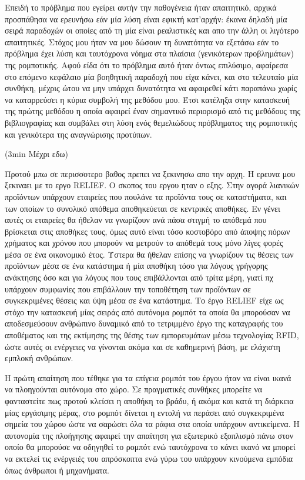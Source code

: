 \documentclass[a4paper,10pt]{article}
\begin{document}
Επειδή το πρόβλημα που εγείρει αυτήν την παθογένεια ήταν απαιτητικό, αρχικά
προσπάθησα να ερευνήσω εάν μία λύση είναι εφικτή κατ'αρχήν: έκανα δηλαδή μία
σειρά παραδοχών οι οποίες από τη μία είναι ρεαλιστικές και απο την άλλη οι
λιγότερο απαιτητικές. Στόχος μου ήταν να μου δώσουν τη δυνατότητα να εξετάσω
εάν το πρόβλημα έχει λύση και ταυτόχρονα νόημα στα πλαίσια (γενικότερων
προβλημάτων) της ρομποτικής. Αφού είδα ότι το πρόβλημα αυτό ήταν όντως
επιλύσιμο, αφαίρεσα στο επόμενο κεφάλαιο μία βοηθητική παραδοχή που είχα κάνει,
και στο τελευταίο μία συνθήκη, μέχρις ώτου να μην υπάρχει δυνατότητα να
αφαιρεθεί κάτι παραπάνω χωρίς να καταρρεύσει η κύρια συμβολή της μεθόδου μου.
Έτσι κατέληξα στην κατασκευή της πρώτης μεθόδου η οποία αφαιρεί έναν σημαντικό
περιορισμό από τις μεθόδους της βιβλιογραφίας και συμβάλει στη λύση ενός
θεμελιώδους πρόβληματος της ρομποτικής και γενικότερα της αναγνώρισης προτύπων.


(3min Μέχρι εδω)



Προτού μπω σε περισσοτερο βαθος πρεπει να ξεκινησω απο την αρχη. Η ερευνα μου
ξεκιναει με το εργο RELIEF. Ο σκοπος του εργου ηταν ο εξης. Στην αγορά λιανικών
προϊόντων υπάρχουν εταιρείες που πουλάνε τα προϊόντα τους σε καταστήματα, και
των οποίων το συνολικό απόθεμα αποθηκεύεται σε κεντρικές αποθήκες. Εν γένει
αυτές οι εταιρείες θα ήθελαν να γνωρίζουν ανά πάσα στιγμή το απόθεμά που
βρίσκεται στις αποθήκες τους, όμως αυτό είναι τόσο κοστοβόρο από άποψης πόρων
χρήματος και χρόνου που μπορούν να μετρούν το απόθεμά τους μόνο λίγες φορές
μέσα σε ένα οικονομικό έτος. Ύστερα θα ήθελαν επίσης να γνωρίζουν τις θέσεις
των προϊόντων μέσα σε ένα κατάστημα ή μία αποθήκη τόσο για λόγους γρήγορης
ανάκτησης όσο και για λόγους που τους επιβάλλονται από τρίτα μέρη, γιατί πχ
υπάρχουν συμφωνίες που επιβάλλουν την τοποθέτηση των προϊόντων σε συγκεκριμένες
θέσεις και ύψη μέσα σε ένα κατάστημα. Το έργο RELIEF είχε ως στόχο την
κατασκευή μίας σειράς από αυτόνομα ρομπότ τα οποία θα μπορούσαν να
αποδεσμεύσουν ανθρώπινο δυναμικό από το τετριμμένο έργο της καταγραφής του
αποθέματος και της εκτίμησης της θέσης των εμπορευμάτων μέσω τεχνολογίας RFID,
ώστε αυτές οι ενέργειες να γίνονται ακόμα και σε καθημερινή βάση, με ελάχιστη
εμπλοκή ανθρώπων.

Η πρώτη απαίτηση που τέθηκε για τα επίγεια ρομπότ του έργου ήταν να είναι ικανά
να πλοηγούνται αυτόνομα στο χώρο. Σε πραγματικές συνθήκες μπορείτε να
φανταστείτε πως προτού κλείσει η αποθήκη το βράδυ, ή ακόμα και κατά τη διάρκεια
μίας εργάσιμης μέρας, στο ρομπότ δίνεται η εντολή να περάσει από συγκεκριμένα
σημεία του χώρου ώστε να σαρώσει όλα τα ράφια στα οποία υπάρχουν αντικείμενα.
Η αυτονομία της πλοήγησης αφαιρεί την απαίτηση για εξωτερικό εξοπλισμό πάνω
στον οποίο θα μπορούσε να οδηγηθεί το ρομπότ ενώ ταυτόχρονα το κάνει ικανό να
μπορεί να εκτελεί τις ενέργειές του απρόσκοπτα ενώ γύρω του υπάρχουν κινούμενα
εμπόδια όπως άνθρωποι ή μηχανήματα.
\end{document}
